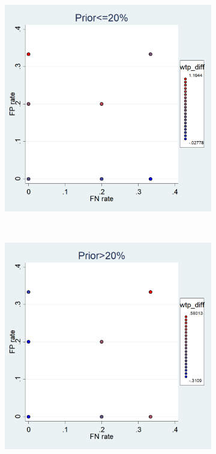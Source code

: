 \documentclass[11pt,a4paper]{article}
\begin{document}
\begin{figure}[H]
\caption{WTP discrepancy by prior and signal characteristics} \label{WTP_discr_heat}
\begin{subfigure}{0.5\textwidth}
\includegraphics[width=\textwidth]{Graphs/WTP_pattern_low.png}
\end{subfigure}
~
\begin{subfigure}{0.5\textwidth}
\includegraphics[width=\textwidth]{Graphs/WTP_pattern_high.png}
\end{subfigure}
\end{figure}
\end{document}
